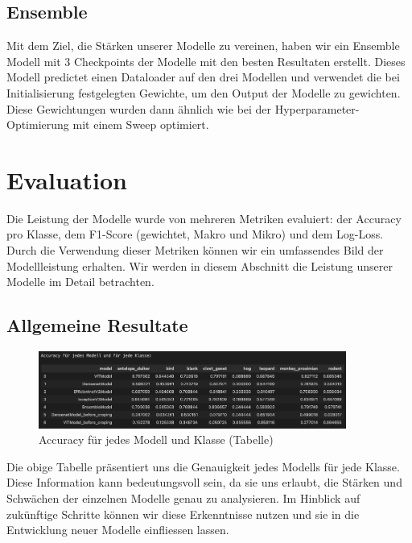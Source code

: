 \documentclass{article}
\begin{document}
\subsection{Ensemble}

Mit dem Ziel, die Stärken unserer Modelle zu vereinen, haben wir ein Ensemble Modell mit 3 Checkpoints der Modelle mit den besten Resultaten erstellt. Dieses Modell predictet einen Dataloader auf den drei Modellen und verwendet die bei Initialisierung festgelegten Gewichte, um den Output der Modelle zu gewichten. Diese Gewichtungen wurden dann ähnlich wie bei der Hyperparameter-Optimierung mit einem Sweep optimiert. 

\newpage

\section{Evaluation}
Die Leistung der Modelle wurde von mehreren Metriken evaluiert: der Accuracy pro Klasse, dem F1-Score (gewichtet, Makro und Mikro) und dem Log-Loss. Durch die Verwendung dieser Metriken können wir ein umfassendes Bild der Modellleistung erhalten. Wir werden in diesem Abschnitt die Leistung unserer Modelle im Detail betrachten.

\subsection{Allgemeine Resultate}

\begin{figure}[!h]
    \centering
    \includegraphics[width=0.9\textwidth]{plots/Accuracy_Tabelle.png}
    \caption{\label{fig:accuracy_table}Accuracy für jedes Modell und Klasse (Tabelle)}
\end{figure}

Die obige Tabelle präsentiert uns die Genauigkeit jedes Modells für jede Klasse. Diese Information kann bedeutungsvoll sein, da sie uns erlaubt, die Stärken und Schwächen der einzelnen Modelle genau zu analysieren. Im Hinblick auf zukünftige Schritte können wir diese Erkenntnisse nutzen und sie in die Entwicklung neuer Modelle einfliessen lassen.
\end{document}
